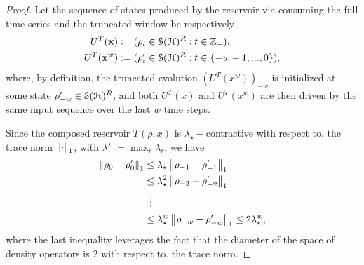 \begin{proof}
    Let the sequence of states produced by the reservoir via consuming the full time series and the truncated window be respectively \begin{equation*} \begin{aligned} U^T({\mathbf{x}}) &:= (\rho_t \in {\mathcal{S}}({\mathcal{H}})^R : t \in {\mathbb{Z}}_-), \\ U^T({\mathbf{x}}^w) &:= (\rho'_t \in {\mathcal{S}}({\mathcal{H}})^R : t \in \{-w+1, ..., 0\}), \end{aligned} \end{equation*} where, by definition, the truncated evolution $(U^T(x^w))_{-w}$ is initialized at some state $\rho'_{-w} \in {\mathcal{S}}({\mathcal{H}})^R$, and both $U^T(x)$ and $U^T(x^w)$ are then driven by the same input sequence over the last $w$ time steps.
    
    Since the composed reservoir $T(\rho, x)$ is $\lambda_\star-$contractive with respect to. the trace norm $\left\lVert\cdot\right\rVert_{1}$, with $\lambda^\star := \max_r \lambda_r$, we have 
    \begin{equation}\label{eq:back-recursion}
    \begin{aligned} \left\lVert\rho_0 - \rho'_0\right\rVert_{1} &\leq \lambda_\star \left\lVert\rho_{-1} - \rho'_{-1}\right\rVert_{1}\\ &\leq \lambda_\star^2 \left\lVert\rho_{-2} - \rho'_{-2}\right\rVert_{1}\\ &\;\;\vdots\\ &\leq \lambda_\star^w \left\lVert\rho_{-w} - \rho'_{-w}\right\rVert_{1} \leq  2 \lambda_\star^w, \end{aligned}
    \end{equation}
    where the last inequality leverages the fact that the diameter of the space of density operators is $2$ with respect to. the trace norm.


\end{proof}
